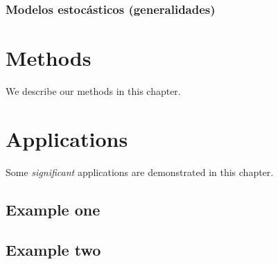 \documentclass[
]{book}
\begin{document}
\hypertarget{modelos-estocuxe1sticos-generalidades}{%
\subsection{Modelos estocásticos (generalidades)}\label{modelos-estocuxe1sticos-generalidades}}

\hypertarget{methods}{%
\chapter{Methods}\label{methods}}

We describe our methods in this chapter.

\hypertarget{applications}{%
\chapter{Applications}\label{applications}}

Some \emph{significant} applications are demonstrated in this chapter.

\hypertarget{example-one}{%
\section{Example one}\label{example-one}}

\hypertarget{example-two}{%
\section{Example two}\label{example-two}}

  
\end{document}
